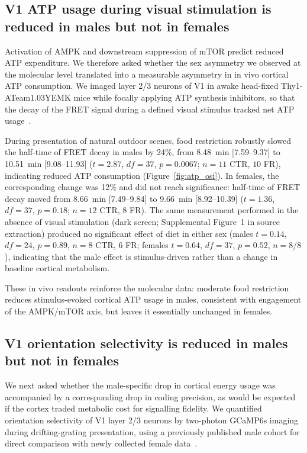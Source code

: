\documentclass[11pt]{article}
\begin{document}
\subsection{V1 ATP usage during visual stimulation is reduced in males but not in females}

Activation of AMPK and downstream suppression of mTOR predict reduced ATP expenditure. We therefore asked whether the sex asymmetry we observed at the molecular level translated into a measurable asymmetry in in vivo cortical ATP consumption. We imaged layer 2/3 neurons of V1 in awake head-fixed Thy1-ATeam1.03YEMK mice while focally applying ATP synthesis inhibitors, so that the decay of the FRET signal during a defined visual stimulus tracked net ATP usage~\citep{imamura2009visualization, tsuyama2013ateam, ando2012visualization, kishikawa2011ateam}.

During presentation of natural outdoor scenes, food restriction robustly slowed the half-time of FRET decay in males by 24\%, from 8.48~min [7.59--9.37] to 10.51~min [9.08--11.93] ($t=2.87$, $df=37$, $p=0.0067$; $n=11$ CTR, $10$ FR), indicating reduced ATP consumption (Figure~\ref{fig:atp_osi}). In females, the corresponding change was 12\% and did not reach significance: half-time of FRET decay moved from 8.66~min [7.49--9.84] to 9.66~min [8.92--10.39] ($t=1.36$, $df=37$, $p=0.18$; $n=12$ CTR, $8$ FR). The same measurement performed in the absence of visual stimulation (dark screen; Supplemental Figure~1 in source extraction) produced no significant effect of diet in either sex (males $t=0.14$, $df=24$, $p=0.89$, $n=8$ CTR, $6$ FR; females $t=0.64$, $df=37$, $p=0.52$, $n=8$/$8$), indicating that the male effect is stimulus-driven rather than a change in baseline cortical metabolism.

These in vivo readouts reinforce the molecular data: moderate food restriction reduces stimulus-evoked cortical ATP usage in males, consistent with engagement of the AMPK/mTOR axis, but leaves it essentially unchanged in females.

\subsection{V1 orientation selectivity is reduced in males but not in females}

We next asked whether the male-specific drop in cortical energy usage was accompanied by a corresponding drop in coding precision, as would be expected if the cortex traded metabolic cost for signalling fidelity. We quantified orientation selectivity of V1 layer 2/3 neurons by two-photon GCaMP6s imaging during drifting-grating presentation, using a previously published male cohort for direct comparison with newly collected female data~\citep{mcclure2019puretones, petousakis2023apical}.
\end{document}
